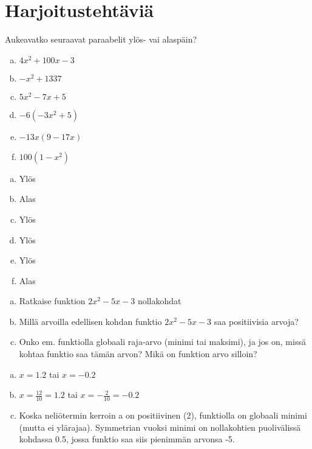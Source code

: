 \section{Harjoitustehtäviä}

\begin{tehtava}
  Aukeavatko seuraavat paraabelit ylös- vai alaspäin?
  \begin{enumerate}[a)]
    \item $4x^2 + 100x - 3$
    \item $-x^2 + 1337$
    \item $5x^2 - 7x + 5$
    \item $-6(-3x^2 + 5)$
    \item $-13x(9 - 17x)$
    \item $100(1-x^2)$
  \end{enumerate}

  \begin{vastaus}
    \begin{enumerate}[a)]
      \item Ylös
      \item Alas
      \item Ylös
      \item Ylös
      \item Ylös
      \item Alas
    \end{enumerate}
  \end{vastaus}
\end{tehtava}

\begin{tehtava}
  \begin{enumerate}[a)]
    \item Ratkaise funktion $2x^2 - 5x - 3$ nollakohdat
    \item Millä arvoilla edellisen kohdan funktio $2x^2 - 5x - 3$ saa positiivisia arvoja?
    \item Onko em. funktiolla globaali raja-arvo (minimi tai maksimi), ja jos on, missä kohtaa funktio saa tämän arvon? Mikä on funktion arvo silloin?
  \end{enumerate}

  \begin{vastaus}
    \begin{enumerate}[a)]
      \item $x = 1.2$ tai $x = -0.2$
      \item $x = \frac{12}{10} = 1.2$ tai $x = -\frac{2}{10} = -0.2$
      \item Koska neliötermin kerroin a on positiivinen (2), funktiolla on globaali minimi (mutta ei ylärajaa). Symmetrian vuoksi minimi on nollakohtien puolivälissä kohdassa 0.5, jossa funktio saa siis pienimmän arvonsa -5.
    \end{enumerate}
  \end{vastaus}
\end{tehtava}


